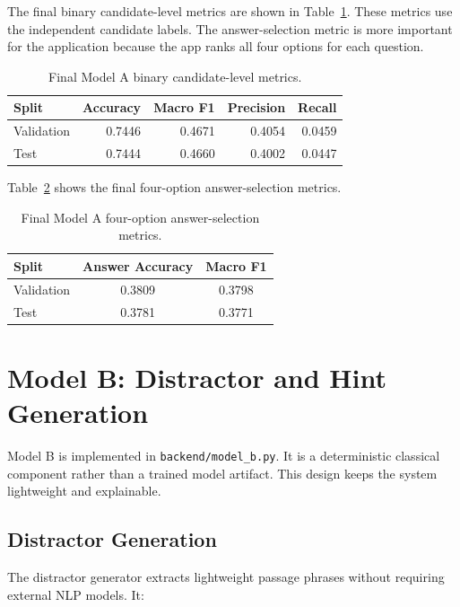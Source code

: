 \documentclass[12pt,a4paper]{article}
\begin{document}
The final binary candidate-level metrics are shown in
Table~\ref{tab:model-a-binary}. These metrics use the independent candidate
labels. The answer-selection metric is more important for the application
because the app ranks all four options for each question.

\begin{table}[H]
\centering
\caption{Final Model A binary candidate-level metrics.}
\label{tab:model-a-binary}
\begin{tabular}{lrrrr}
\toprule
\textbf{Split} & \textbf{Accuracy} & \textbf{Macro F1} & \textbf{Precision} & \textbf{Recall} \\
\midrule
Validation & 0.7446 & 0.4671 & 0.4054 & 0.0459 \\
Test & 0.7444 & 0.4660 & 0.4002 & 0.0447 \\
\bottomrule
\end{tabular}
\end{table}

Table~\ref{tab:model-a-answer} shows the final four-option answer-selection
metrics.

\begin{table}[H]
\centering
\caption{Final Model A four-option answer-selection metrics.}
\label{tab:model-a-answer}
\begin{tabular}{lcc}
\toprule
\textbf{Split} & \textbf{Answer Accuracy} & \textbf{Macro F1} \\
\midrule
Validation & 0.3809 & 0.3798 \\
Test & 0.3781 & 0.3771 \\
\bottomrule
\end{tabular}
\end{table}

\section{Model B: Distractor and Hint Generation}

Model B is implemented in \texttt{backend/model\_b.py}. It is a deterministic
classical component rather than a trained model artifact. This design keeps the
system lightweight and explainable.

\subsection{Distractor Generation}

The distractor generator extracts lightweight passage phrases without requiring
external NLP models. It:
\end{document}
